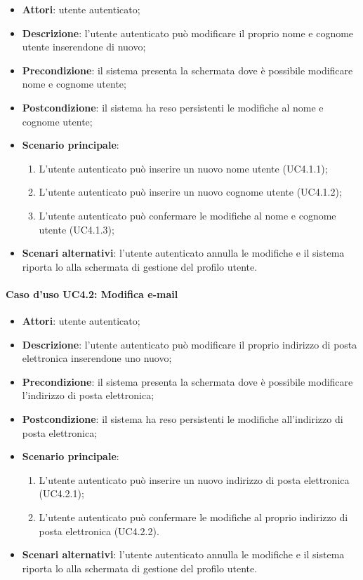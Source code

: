 \begin{itemize}
	\item \textbf{Attori}: utente autenticato;
	\item \textbf{Descrizione}: l'utente autenticato può modificare il proprio nome e cognome utente inserendone di nuovo;
	\item \textbf{Precondizione}: il sistema presenta la schermata dove è possibile modificare nome e cognome utente;
	\item \textbf{Postcondizione}: il sistema ha reso persistenti le modifiche al nome e cognome utente;
	\item \textbf{Scenario principale}:
		\begin{enumerate}
			\item L'utente autenticato può inserire un nuovo nome utente (UC4.1.1);
			\item L'utente autenticato può inserire un nuovo cognome utente (UC4.1.2);
			\item L'utente autenticato può confermare le modifiche al nome e cognome utente (UC4.1.3);
		\end{enumerate}
	\item \textbf{Scenari alternativi}: l'utente autenticato annulla le modifiche e il sistema riporta lo alla schermata di gestione del profilo utente.
\end{itemize}

\paragraph{Caso d'uso UC4.2: Modifica e-mail}

\begin{itemize}
	\item \textbf{Attori}: utente autenticato;
	\item \textbf{Descrizione}: l'utente autenticato può modificare il proprio indirizzo di posta elettronica inserendone uno nuovo;
	\item \textbf{Precondizione}: il sistema presenta la schermata dove è possibile modificare l'indirizzo di posta elettronica;
	\item \textbf{Postcondizione}: il sistema ha reso persistenti le modifiche all'indirizzo di posta elettronica;
	\item \textbf{Scenario principale}:
		\begin{enumerate}
			\item L'utente autenticato può inserire un nuovo indirizzo di posta elettronica (UC4.2.1);
			\item L'utente autenticato può confermare le modifiche al proprio indirizzo di posta elettronica (UC4.2.2).
		\end{enumerate}
	\item \textbf{Scenari alternativi}: l'utente autenticato annulla le modifiche e il sistema riporta lo alla schermata di gestione del profilo utente.
\end{itemize}

